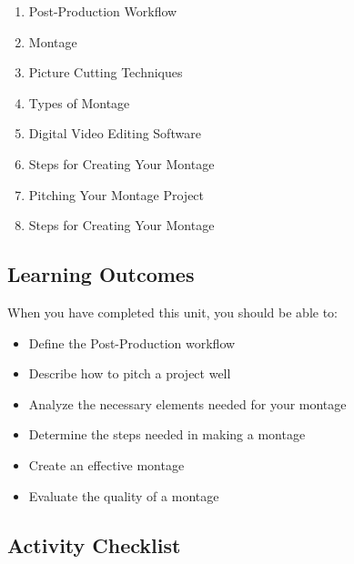 \documentclass[
]{book}
\providecommand{\tightlist}{%
  \setlength{\itemsep}{0pt}\setlength{\parskip}{0pt}}
\begin{document}
\begin{enumerate}
\def\labelenumi{\arabic{enumi}.}
\tightlist
\item
  Post-Production Workflow\\
\item
  Montage\\
\item
  Picture Cutting Techniques\\
\item
  Types of Montage\\
\item
  Digital Video Editing Software\\
\item
  Steps for Creating Your Montage\\
\item
  Pitching Your Montage Project\\
\item
  Steps for Creating Your Montage
\end{enumerate}

\hypertarget{learning-outcomes-6}{%
\subsection*{Learning Outcomes}\label{learning-outcomes-6}}

When you have completed this unit, you should be able to:

\begin{itemize}
\item
  Define the Post-Production workflow
\item
  Describe how to pitch a project well
\item
  Analyze the necessary elements needed for your montage
\item
  Determine the steps needed in making a montage
\item
  Create an effective montage
\item
  Evaluate the quality of a montage
\end{itemize}

\hypertarget{activity-checklist-6}{%
\subsection*{Activity Checklist}\label{activity-checklist-6}}
\end{document}
